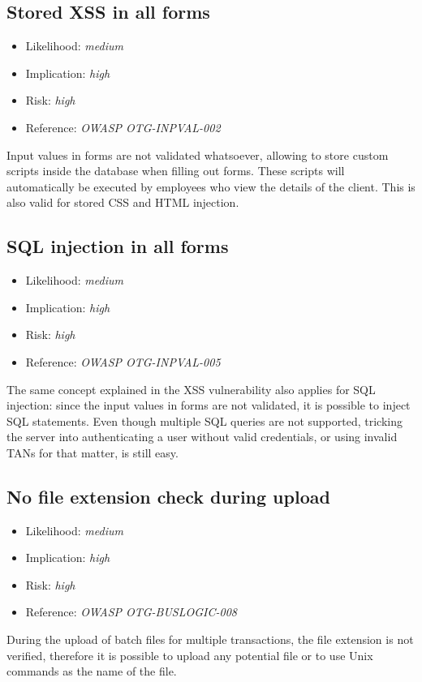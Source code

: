 \subsection{Stored XSS in all forms} \label{over:xss}
\begin{itemize}
	\item Likelihood: \textit{medium}
	\item Implication: \textit{high}
	\item Risk: \textit{high}
	\item Reference: \textit{OWASP OTG-INPVAL-002}
\end{itemize}
Input values in forms are not validated whatsoever, allowing to store custom scripts inside the database when filling out forms. These scripts will automatically be executed by employees who view the details of the client. This is also valid for stored CSS and HTML injection.
\subsection{SQL injection in all forms} \label{over:sql}
\begin{itemize}
	\item Likelihood: \textit{medium}
	\item Implication: \textit{high}
	\item Risk: \textit{high}
	\item Reference: \textit{OWASP OTG-INPVAL-005}
\end{itemize}
The same concept explained in the XSS vulnerability also applies for SQL injection: since the input values in forms are not validated, it is possible to inject SQL statements. Even though multiple SQL queries are not supported, tricking the server into authenticating a user without valid credentials, or using invalid TANs for that matter, is still easy.
\subsection{No file extension check during upload} \label{over:extension}
\begin{itemize}
	\item Likelihood: \textit{medium}
	\item Implication: \textit{high}
	\item Risk: \textit{high}
	\item Reference: \textit{OWASP OTG-BUSLOGIC-008}
\end{itemize}
During the upload of batch files for multiple transactions, the file extension is not verified, therefore it is possible to upload any potential file or to use Unix commands as the name of the file.
